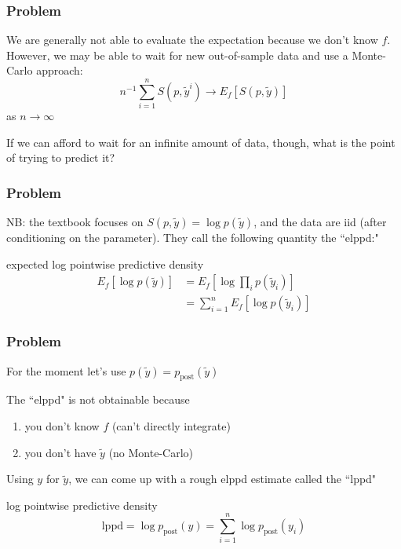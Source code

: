 \documentclass{beamer}
\begin{document}
\begin{frame}
\frametitle{Problem}


We are generally not able to evaluate the expectation because we don't know $f$. However, we may be able to wait for new out-of-sample data and use a Monte-Carlo approach:
\[
n^{-1}\sum_{i=1}^{n} S(p,\tilde{y}^i) \to E_f[S(p,\tilde{y})]
\]
as $n \to \infty$
\newline
\pause

If we can afford to wait for an infinite amount of data, though, what is the point of trying to predict it?

\end{frame}



\begin{frame}
\frametitle{Problem}

NB: the textbook focuses on $S(p,\tilde{y}) = \log p(\tilde{y})$, and the data are iid (after conditioning on the parameter). They call the following quantity the ``elppd:"

\begin{block}{expected log pointwise predictive density}
\begin{align*}
E_f [\log p(\tilde{y})] &= E_f\left[\log \prod_i p(\tilde{y}_i) \right] \\
&= \sum_{i=1}^nE_f\left[ \log p(\tilde{y}_i) \right]
\end{align*}
\end{block}

\end{frame}

\begin{frame}
\frametitle{Problem}

For the moment let's use $p(\tilde{y}) = p_{\text{post}}(\tilde{y})$
\newline

The ``elppd" is not obtainable because
\begin{enumerate}
\item you don't know $f$ (can't directly integrate)
\item you don't have $\tilde{y}$ (no Monte-Carlo)
\end{enumerate}
\pause

Using $y$ for $\tilde{y}$, we can come up with a rough elppd estimate called the ``lppd"
\begin{block}{log pointwise predictive density}
\[
\text{lppd} = \log p_{\text{post}}(y) = \sum_{i=1}^n \log p_{\text{post}}(y_i) 
\]
\end{block}



\end{frame}
\end{document}

